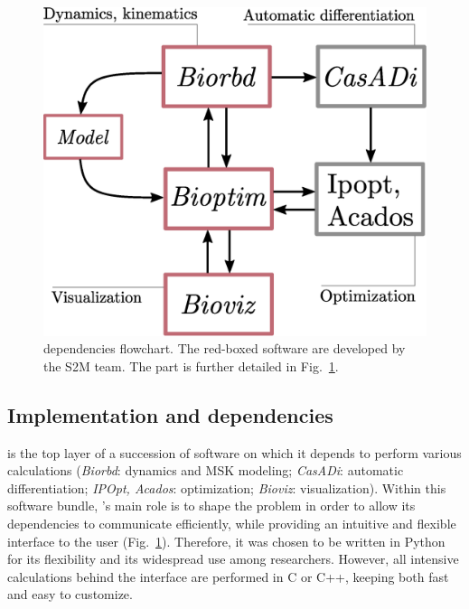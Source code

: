 \begin{figure}[t!]
\centering
\includegraphics[width=0.9\columnwidth]{figures/dependencies.eps}
\caption{\bioptim dependencies flowchart. The red-boxed software are developed by the S2M team. The \bioptim part is further detailed in Fig.~\ref{fig:dependencies}.}
\label{fig:dependencies}
\vspace*{-0.5cm}
\end{figure}


\subsection{Implementation and dependencies}
\bioptim is the top layer of a succession of software on which it depends to perform various calculations (\textit{Biorbd}: dynamics and MSK modeling; \textit{CasADi}: automatic differentiation; \textit{IPOpt, Acados}: optimization; \textit{Bioviz}: visualization).
Within this software bundle, \bioptim 's main role is to shape the problem in order to allow its dependencies to communicate efficiently, while providing an intuitive and flexible interface to the user (Fig.~\ref{fig:dependencies}).
Therefore, it was chosen to be written in Python for its flexibility and its widespread use among researchers.
However, all intensive calculations behind the interface are performed in C or C++, keeping \bioptim both fast and easy to customize.

